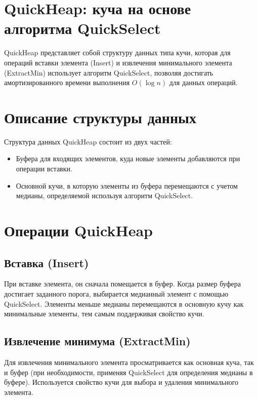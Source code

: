 \section*{QuickHeap: куча на основе алгоритма QuickSelect}


QuickHeap представляет собой структуру данных типа кучи, которая для операций вставки элемента (Insert) и извлечения минимального элемента (ExtractMin) использует алгоритм QuickSelect, позволяя достигать амортизированного времени выполнения $O(\log n)$ для данных операций. 

\section{Описание структуры данных}

Структура данных QuickHeap состоит из двух частей:
\begin{itemize}
    \item Буфера для входящих элементов, куда новые элементы добавляются при операции вставки.
    \item Основной кучи, в которую элементы из буфера перемещаются с учетом медианы, определяемой используя алгоритм QuickSelect.
\end{itemize}

\section{Операции QuickHeap}

\subsection{Вставка (Insert)}

При вставке элемента, он сначала помещается в буфер. Когда размер буфера достигает заданного порога, выбирается медианный элемент с помощью QuickSelect. Элементы меньше медианы перемещаются в основную кучу как минимальные элементы, тем самым поддерживая свойство кучи.

\subsection{Извлечение минимума (ExtractMin)}

Для извлечения минимального элемента просматривается как основная куча, так и буфер (при необходимости, применяя QuickSelect для определения медианы в буфере). Используется свойство кучи для выбора и удаления минимального элемента.

